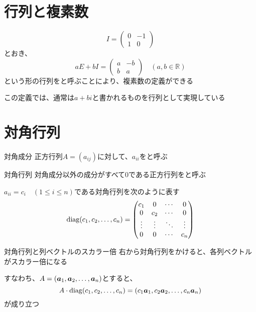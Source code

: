 \documentclass[../../../topic_linear-map]{subfiles}
\begin{document}
\sectionline
\section{行列と複素数}

\begin{equation*}
  I = \begin{pmatrix}
    0 & -1 \\
    1 & 0
  \end{pmatrix}
\end{equation*}
とおき、
\begin{equation*}
  aE + bI = \begin{pmatrix}
    a & -b \\
    b & a
  \end{pmatrix} \quad (a, b \in \mathbb{R})
\end{equation*}
という形の行列をと呼ぶことにより、複素数の定義ができる

この定義では、通常は$a + bi$と書かれるものを行列として実現している

\br

\sectionline
\section{対角行列}

\begin{definition}{対角成分}
  正方行列$A = (a_{ij})$に対して、$a_{ii}$をと呼ぶ
\end{definition}

\begin{definition}{対角行列}
  対角成分以外の成分がすべて0である正方行列をと呼ぶ

  $a_{ii} = c_i \quad (1 \leq i \leq n)$である対角行列を次のように表す
  \begin{equation*}
    \operatorname{diag}(c_1, c_2, \ldots, c_n) = \begin{pmatrix}
      c_1    & 0      & \cdots & 0      \\
      0      & c_2    & \cdots & 0      \\
      \vdots & \vdots & \ddots & \vdots \\
      0      & 0      & \cdots & c_n
    \end{pmatrix}
  \end{equation*}
\end{definition}

\begin{theorem}{対角行列と列ベクトルのスカラー倍}
  右から対角行列をかけると、各列ベクトルがスカラー倍になる

  すなわち、$A = (\vb*{a}_1, \vb*{a}_2, \ldots, \vb*{a}_n)$とすると、
  \begin{equation*}
    A \cdot \operatorname{diag}(c_1, c_2, \ldots, c_n) = (c_1\vb*{a}_1, c_2\vb*{a}_2, \ldots, c_n\vb*{a}_n)
  \end{equation*}
  が成り立つ
\end{theorem}
\end{document}

